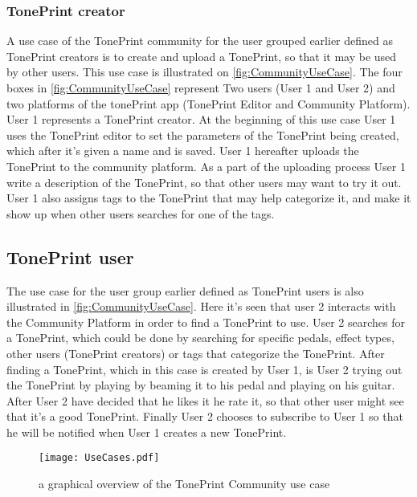 \subsubsection*{TonePrint creator}
\label{UseCase1}
%
A use case of the TonePrint community for the user grouped earlier defined as TonePrint creators is to create and upload a TonePrint, so that it may be used by other users. This use case is illustrated on \autoref{fig:CommunityUseCase}. The four boxes in \autoref{fig:CommunityUseCase} represent Two users (User 1 and User 2) and two platforms of the tonePrint app (TonePrint Editor and Community Platform). User 1 represents a TonePrint creator. At the beginning of this use case User 1 uses the TonePrint editor to set the parameters of the TonePrint being created, which after it's given a name and is saved. User 1 hereafter uploads the TonePrint to the community platform. As a part of the uploading process User 1 write a description of the TonePrint, so that other users may want to try it out. User 1 also assigns tags to the TonePrint that may help categorize it, and make it show up when other users searches for one of the tags. 

\subsection*{TonePrint user}
\label{UseCase2}
%
The use case for the user group earlier defined as TonePrint users is also illustrated in \autoref{fig:CommunityUseCase}. Here it's seen that user 2 interacts with the Community Platform in order to find a TonePrint to use. User 2 searches for a TonePrint, which could be done by searching for specific pedals, effect types, other users (TonePrint creators) or tags that categorize the TonePrint. After finding a TonePrint, which in this case is created by User 1, is User 2 trying out the TonePrint by playing by beaming it to his pedal and playing on his guitar. After User 2 have decided that he likes it he rate it, so that other user might see that it's a good TonePrint. Finally User 2 chooses to subscribe to User 1 so that he will be notified when User 1 creates a new TonePrint.\\

\begin{figure}[H]
	\centering
	\texttt{[image: UseCases.pdf]}
	\caption{a graphical overview of the TonePrint Community use case}
	\label{fig:CommunityUseCase}
\end{figure}

